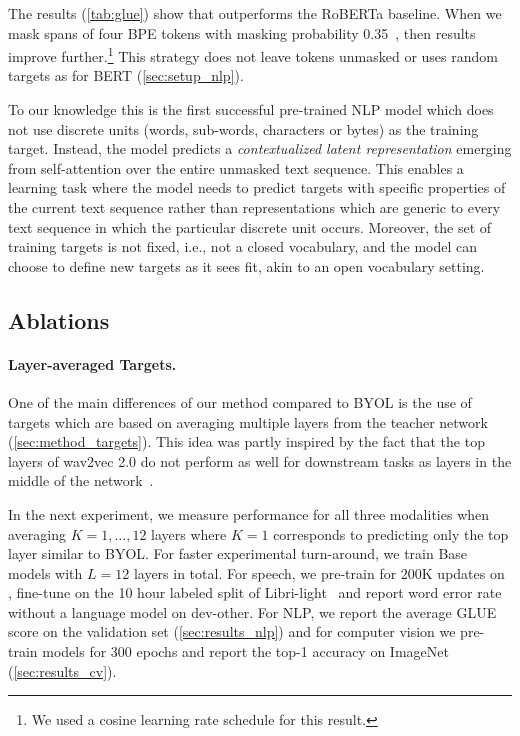 \documentclass[nohyperref]{article}
\theoremstyle{plain}
\theoremstyle{definition}
\theoremstyle{remark}
\begin{document}
The results (\autoref{tab:glue}) show that \name{} outperforms the RoBERTa baseline.
When we mask spans of four BPE tokens with masking probability 0.35~\citep{baevski2020wav}, then results improve further.\footnote{We used a cosine learning rate schedule for this result.} 
This strategy does not leave tokens unmasked or uses random targets as for BERT (\textsection\ref{sec:setup_nlp}).

\insertLayerAblation

To our knowledge this is the first successful pre-trained NLP model which does not use discrete units (words, sub-words, characters or bytes) as the training target. 
Instead, the model predicts a \emph{contextualized latent representation} emerging from self-attention over the entire unmasked text sequence.
This enables a learning task where the model needs to predict targets with specific properties of the current text sequence rather than representations which are generic to every text sequence in which the particular discrete unit occurs.
Moreover, the set of training targets is not fixed, i.e., not a closed vocabulary, and the model can choose to define new targets as it sees fit, akin to an open vocabulary setting.

\insertContextAblation

\subsection{Ablations}
\label{sec:ablations}

\paragraph{Layer-averaged Targets.}
One of the main differences of our method compared to BYOL is the use of targets which are based on averaging multiple layers from the teacher network (\textsection\ref{sec:method_targets}).
This idea was partly inspired by the fact that the top layers of wav2vec 2.0 do not perform as well for downstream tasks as layers in the middle of the network~\citep{baevski2021unsupervised,pasad2021layerwise}.

In the next experiment, we measure performance for all three modalities when averaging $K=1,\dots,12$ layers where $K=1$ corresponds to predicting only the top layer similar to BYOL.
For faster experimental turn-around, we train Base models with $L=12$ layers in total.
For speech, we pre-train for 200K updates on \libri{}, fine-tune on the 10 hour labeled split of Libri-light~\citep{librilight} and report word error rate without a language model on dev-other.
For NLP, we report the average GLUE score on the validation set (\textsection\ref{sec:results_nlp}) and for computer vision we pre-train models for 300 epochs and report the top-1 accuracy on ImageNet (\textsection\ref{sec:results_cv}).
\end{document}
